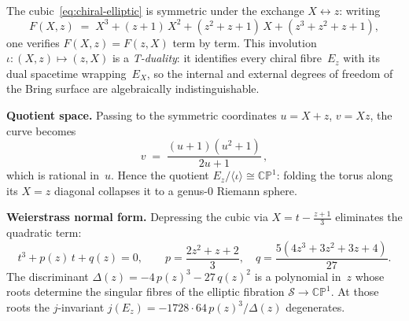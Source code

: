 \begin{remark}
\label{rem:t-duality-elliptic}
The cubic~\eqref{eq:chiral-elliptic} is symmetric under the exchange
$X\leftrightarrow z$: writing
\[
  F(X,z)\;=\;X^3+(z+1)\,X^2+(z^2+z+1)\,X+(z^3+z^2+z+1),
\]
one verifies $F(X,z)=F(z,X)$ term by term.  This involution
$\iota\colon(X,z)\mapsto(z,X)$ is a \emph{T-duality}: it identifies
every chiral fibre~$E_z$ with its dual spacetime wrapping~$E_X$, so
the internal and external degrees of freedom of the Bring surface are
algebraically indistinguishable.

\medskip\noindent\textbf{Quotient space.}\;
Passing to the symmetric coordinates $u=X+z$, $v=Xz$, the curve
becomes
\begin{equation}\label{eq:symmetric-quotient}
  v \;=\; \frac{(u+1)(u^2+1)}{2u+1}\,,
\end{equation}
which is rational in~$u$.  Hence the quotient
$E_z/\langle\iota\rangle\cong\mathbb{CP}^1$: folding the torus along
its $X=z$ diagonal collapses it to a genus-$0$ Riemann sphere.

\medskip\noindent\textbf{Weierstrass normal form.}\;
Depressing the cubic via $X=t-\tfrac{z+1}{3}$ eliminates the quadratic
term:
\begin{equation}\label{eq:weierstrass-depressed}
  t^{3}+p(z)\,t+q(z)=0,\qquad
  p=\frac{2z^2+z+2}{3},\quad
  q=\frac{5(4z^3+3z^2+3z+4)}{27}.
\end{equation}
The discriminant $\Delta(z)=-4\,p(z)^3-27\,q(z)^2$ is a polynomial in~$z$
whose roots determine the singular fibres of the elliptic
fibration $\mathcal{S}\to\mathbb{CP}^1$.  At those roots the
$j$-invariant $j(E_z)=-1728\cdot 64\,p(z)^3/\Delta(z)$ degenerates.
\end{remark}

